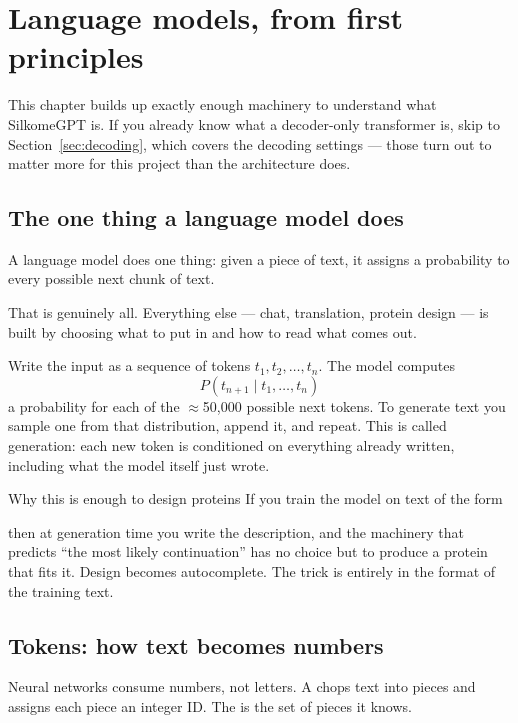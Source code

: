 \chapter{Language models, from first principles}
\label{ch:transformers}

This chapter builds up exactly enough machinery to understand what SilkomeGPT
is. If you already know what a decoder-only transformer is, skip to
Section~\ref{sec:decoding}, which covers the decoding settings --- those turn
out to matter more for this project than the architecture does.

\section{The one thing a language model does}

A language model does one thing: given a piece of text, it assigns a
probability to every possible next chunk of text.

That is genuinely all. Everything else --- chat, translation, protein design ---
is built by choosing what to put in and how to read what comes out.

Write the input as a sequence of tokens $t_1, t_2, \dots, t_n$. The model
computes
\[
  P(t_{n+1} \mid t_1, \dots, t_n)
\]
a probability for each of the $\approx$50{,}000 possible next tokens. To
generate text you sample one from that distribution, append it, and repeat.
This is called  generation: each new token is conditioned
on everything already written, including what the model itself just wrote.

\begin{keybox}{Why this is enough to design proteins}
If you train the model on text of the form
\begin{center}
\end{center}
then at generation time you write the description, and the machinery that
predicts ``the most likely continuation'' has no choice but to produce a
protein that fits it. Design becomes autocomplete. The trick is entirely in the
format of the training text.
\end{keybox}

\section{Tokens: how text becomes numbers}

Neural networks consume numbers, not letters. A  chops text
into pieces and assigns each piece an integer ID. The  is the
set of pieces it knows.


